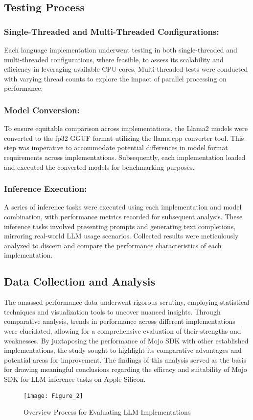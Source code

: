 \documentclass[sigconf]{acmart}
\begin{document}
\subsection{Testing Process}
\subsubsection{Single-Threaded and Multi-Threaded Configurations: }
Each language implementation underwent testing in both single-threaded and multi-threaded configurations, where feasible, to assess its scalability and efficiency in leveraging available CPU cores. Multi-threaded tests were conducted with varying thread counts to explore the impact of parallel processing on performance.

\subsubsection{Model Conversion: }
To ensure equitable comparison across implementations, the Llama2 models were converted to the fp32 GGUF format utilizing the llama.cpp converter tool. This step was imperative to accommodate potential differences in model format requirements across implementations. Subsequently, each implementation loaded and executed the converted models for benchmarking purposes.

\subsubsection{Inference Execution: }
A series of inference tasks were executed using each implementation and model combination, with performance metrics recorded for subsequent analysis. These inference tasks involved presenting prompts and generating text completions, mirroring real-world LLM usage scenarios. Collected results were meticulously analyzed to discern and compare the performance characteristics of each implementation.

\subsection{Data Collection and Analysis}
The amassed performance data underwent rigorous scrutiny, employing statistical techniques and visualization tools to uncover nuanced insights. Through comparative analysis, trends in performance across different implementations were elucidated, allowing for a comprehensive evaluation of their strengths and weaknesses. By juxtaposing the performance of Mojo SDK with other established implementations, the study sought to highlight its comparative advantages and potential areas for improvement. The findings of this analysis served as the basis for drawing meaningful conclusions regarding the efficacy and suitability of Mojo SDK for LLM inference tasks on Apple Silicon.
\begin{figure}[htbp]
  \centering
  \texttt{[image: Figure\_2]}
  \caption{Overview Process for Evaluating LLM Implementations}
\end{figure}
\end{document}
